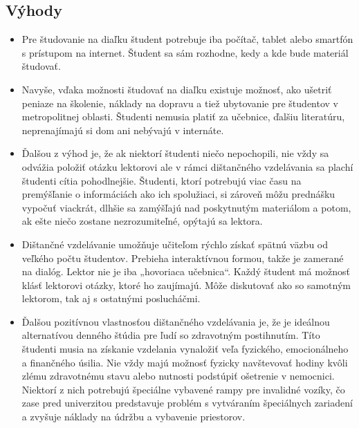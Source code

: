 \documentclass[10pt,oneside,slovak,a4paper]{article}
\begin{document}
\subsection{Výhody}
\begin{itemize}
	\item Pre študovanie na diaľku študent potrebuje iba počítač, tablet alebo smartfón s prístupom na internet. Študent sa sám rozhodne, kedy a kde bude materiál študovať.\cite{Sokolova2018}
	\item Navyše, vďaka možnosti študovať na diaľku existuje možnosť, ako ušetriť peniaze na školenie, náklady na dopravu a tiež ubytovanie pre študentov v metropolitnej oblasti.
	Študenti nemusia platiť za učebnice, ďalšiu literatúru, neprenajímajú si dom ani nebývajú v internáte.\cite{Sokolova2018}
	\item Ďalšou z výhod je, že ak niektorí študenti niečo nepochopili, nie vždy sa odvážia položiť otázku lektorovi ale v rámci dištančného vzdelávania sa plachí študenti cítia pohodlnejšie.
	Študenti, ktorí potrebujú viac času na premýšľanie o informáciách ako ich spolužiaci, si zároveň môžu prednášku vypočuť viackrát, dlhšie sa zamýšľajú nad poskytnutým materiálom a potom, ak ešte niečo zostane nezrozumiteľné, opýtajú sa lektora.\cite{Sokolova2018}
	\item Dištančné vzdelávanie umožňuje učiteľom rýchlo získať spätnú väzbu od veľkého počtu študentov. Prebieha interaktívnou formou, takže je zamerané na dialóg.
	Lektor nie je iba „hovoriaca učebnica“. Každý študent má možnosť klásť lektorovi otázky, ktoré ho zaujímajú. Môže diskutovať ako so samotným lektorom, tak aj s ostatnými poslucháčmi.\cite{Sokolova2018}
	\item Ďalšou pozitívnou vlastnosťou dištančného vzdelávania je, že je ideálnou alternatívou denného štúdia pre ľudí so zdravotným postihnutím.
	Títo študenti musia na získanie vzdelania vynaložiť veľa fyzického, emocionálneho a finančného úsilia.
	Nie vždy majú možnosť fyzicky navštevovať hodiny kvôli zlému zdravotnému stavu alebo nutnosti podstúpiť ošetrenie v nemocnici.
	Niektorí z nich potrebujú špeciálne vybavené rampy pre invalidné vozíky, čo zase pred univerzitou predstavuje problém s vytváraním špeciálnych zariadení a zvyšuje náklady na údržbu a vybavenie priestorov.\cite{Sokolova2018} 
\end{itemize}
\end{document}
